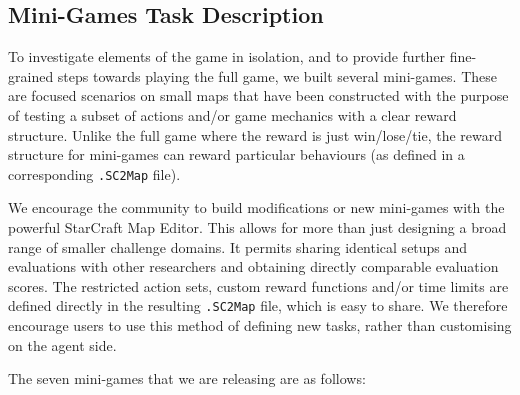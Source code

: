 \documentclass{article}
\begin{document}
\subsection{Mini-Games Task Description}

To investigate elements of the game in isolation, and to provide further fine-grained steps towards playing the full game, we built several mini-games. These are focused scenarios on small maps that have been constructed with the purpose of testing a subset of actions and/or game mechanics with a clear reward structure. Unlike the full game where the reward is 
just win/lose/tie,
the reward structure for mini-games can reward particular behaviours (as defined in a corresponding \texttt{.SC2Map} file). 

We encourage the community to build modifications or new mini-games with the powerful StarCraft Map Editor. This allows for more than just designing a broad range of smaller challenge domains. It permits sharing identical setups and evaluations with other researchers and obtaining directly comparable evaluation scores. The restricted action sets, custom reward functions and/or time limits are defined directly in the resulting \texttt{.SC2Map} file, which is easy to share. We therefore encourage users to use this method of defining new tasks, rather than customising on the agent side.



The seven mini-games that we are releasing are as follows:
\end{document}
